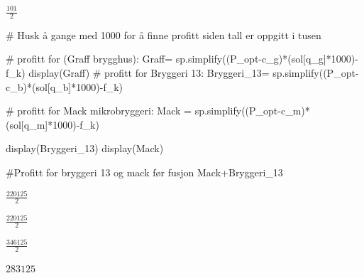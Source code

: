 \documentclass[
  12pt,
  a4paper,
  DIV=11,
  numbers=noendperiod]{scrartcl}
\newenvironment{Shaded}{\begin{snugshade}}{\end{snugshade}}
\newcommand{\CommentTok}[1]{\textcolor[rgb]{0.37,0.37,0.37}{#1}}
\newcommand{\DecValTok}[1]{\textcolor[rgb]{0.68,0.00,0.00}{#1}}
\newcommand{\NormalTok}[1]{\textcolor[rgb]{0.00,0.23,0.31}{#1}}
\newcommand{\OperatorTok}[1]{\textcolor[rgb]{0.37,0.37,0.37}{#1}}
\begin{document}
$\displaystyle \frac{101}{2}$

\begin{Shaded}
\begin{Highlighting}[]
\CommentTok{\# Husk å gange med 1000 for å finne profitt siden tall er oppgitt i tusen}

\CommentTok{\# profitt for (Graff brygghus):}
\NormalTok{Graff}\OperatorTok{=}\NormalTok{ sp.simplify((P\_opt}\OperatorTok{{-}}\NormalTok{c\_g)}\OperatorTok{*}\NormalTok{(sol[q\_g]}\OperatorTok{*}\DecValTok{1000}\NormalTok{)}\OperatorTok{{-}}\NormalTok{f\_k)}
\NormalTok{display(Graff)}
\CommentTok{\# profitt for Bryggeri 13:}
\NormalTok{Bryggeri\_13}\OperatorTok{=}\NormalTok{ sp.simplify((P\_opt}\OperatorTok{{-}}\NormalTok{c\_b)}\OperatorTok{*}\NormalTok{(sol[q\_b]}\OperatorTok{*}\DecValTok{1000}\NormalTok{)}\OperatorTok{{-}}\NormalTok{f\_k)}

\CommentTok{\# profitt for Mack mikrobryggeri:}
\NormalTok{Mack }\OperatorTok{=}\NormalTok{ sp.simplify((P\_opt}\OperatorTok{{-}}\NormalTok{c\_m)}\OperatorTok{*}\NormalTok{(sol[q\_m]}\OperatorTok{*}\DecValTok{1000}\NormalTok{)}\OperatorTok{{-}}\NormalTok{f\_k)}

\NormalTok{display(Bryggeri\_13)}
\NormalTok{display(Mack)}

\CommentTok{\#Profitt for bryggeri 13 og mack før fusjon}
\NormalTok{Mack}\OperatorTok{+}\NormalTok{Bryggeri\_13}
\end{Highlighting}
\end{Shaded}

$\displaystyle \frac{220125}{2}$

$\displaystyle \frac{220125}{2}$

$\displaystyle \frac{346125}{2}$

$\displaystyle 283125$
\end{document}
